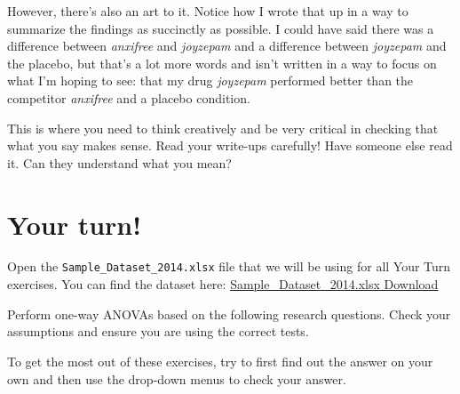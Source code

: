 \documentclass[
]{book}
\begin{document}
However, there's also an art to it. Notice how I wrote that up in a way to summarize the findings as succinctly as possible. I could have said there was a difference between \emph{anxifree} and \emph{joyzepam} and a difference between \emph{joyzepam} and the placebo, but that's a lot more words and isn't written in a way to focus on what I'm hoping to see: that my drug \emph{joyzepam} performed better than the competitor \emph{anxifree} and a placebo condition.

This is where you need to think creatively and be very critical in checking that what you say makes sense. Read your write-ups carefully! Have someone else read it. Can they understand what you mean?

\hypertarget{your-turn-4}{%
\section{Your turn!}\label{your-turn-4}}

Open the \texttt{Sample\_Dataset\_2014.xlsx} file that we will be using for all Your Turn exercises. You can find the dataset here: \href{https://github.com/danawanzer/stats-with-jamovi/blob/master/data/Sample_Dataset_2014.xlsx}{Sample\_Dataset\_2014.xlsx Download}

Perform one-way ANOVAs based on the following research questions. Check your assumptions and ensure you are using the correct tests.

To get the most out of these exercises, try to first find out the answer on your own and then use the drop-down menus to check your answer.
\end{document}
